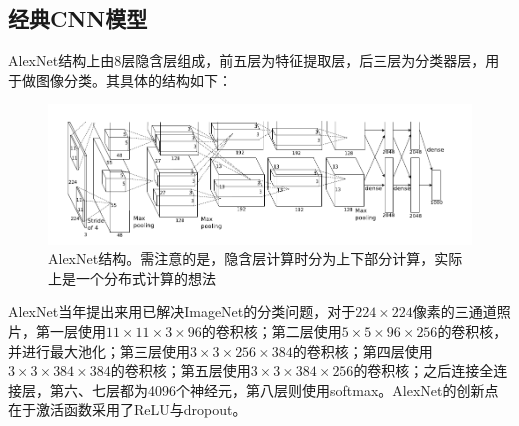 \subsection{经典CNN模型}
AlexNet结构上由8层隐含层组成，前五层为特征提取层，后三层为分类器层，用于做图像分类。其具体的结构如下：
\begin{figure}[htb]
\centering
\includegraphics[scale=0.6]{../figures/AlexNet.png}
\caption{AlexNet结构。需注意的是，隐含层计算时分为上下部分计算，实际上是一个分布式计算的想法}
\label{fig:cnn4}
\end{figure}
AlexNet当年提出来用已解决ImageNet的分类问题，对于$224\times224$像素的三通道照片，第一层使用$11\times11\times3\times96$的卷积核；第二层使用$5\times5\times96\times256$的卷积核，并进行最大池化；第三层使用$3\times3\times256\times384$的卷积核；第四层使用$3\times3\times384\times384$的卷积核；第五层使用$3\times3\times384\times256$的卷积核；之后连接全连接层，第六、七层都为4096个神经元，第八层则使用softmax。AlexNet的创新点在于激活函数采用了ReLU与dropout。

